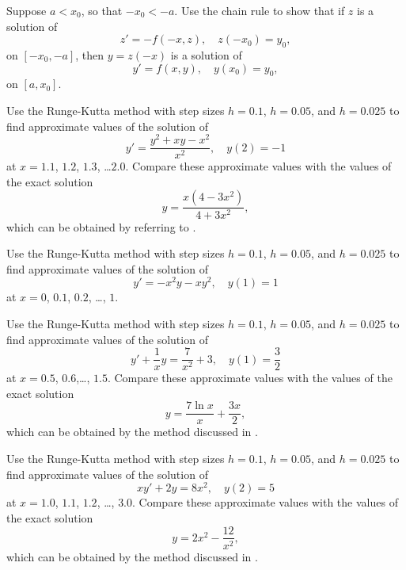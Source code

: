 \begin{exerciselist}
\item\label{exer:3.3.23}\Cex
Suppose $a<x_0$, so that $-x_0<-a$.
Use the chain rule to show that if  $z$ is a solution of
\[
z'=-f(-x,z),\quad z(-x_0)=y_0,
\]
on $[-x_0,-a]$, then $y=z(-x)$ is a solution of
\[
y'=f(x,y),\quad y(x_0)=y_0,
\]
on $[a,x_0]$.

\item\label{exer:3.3.24}\Cex
Use the Runge-Kutta  method with step sizes $h=0.1$, $h=0.05$,
and $h=0.025$ to find approximate values of the solution of
\[
y'=\frac{y^2+xy-x^2}{x^2},\quad y(2)=-1
\]
at $x=1.1$, $1.2$, $1.3$, \dots $2.0$.
 Compare these approximate values
with the values of the exact solution
\[
y=\frac{x(4-3x^2)}{4+3x^2},
\]
which can be obtained by referring to .

\item\label{exer:3.3.25}\Cex
Use the Runge-Kutta  method with step sizes $h=0.1$,  $h=0.05$,
and $h=0.025$
 to find approximate values of the solution of
\[
y'=-x^2y-xy^2,\quad y(1)=1
\]
at $x=0$, $0.1$, $0.2$, \dots, $1$.

\item\label{exer:3.3.26}\Cex
Use the Runge-Kutta  method with step sizes $h=0.1$,  $h=0.05$,
and $h=0.025$
 to find approximate values of the solution of
\[
y'+\frac{1}{x}y=\frac{7}{x^2}+3,\quad y(1)=\frac{3}{2}
\]
at $x=0.5$, $0.6$,\dots, $1.5$.
 Compare these approximate values
with the values of the exact solution
\[
y=\frac{7\ln x}{x}+\frac{3x}{2},
\]
which can be obtained by the method discussed in
.

\item\label{exer:3.3.27}\Cex
Use the Runge-Kutta  method with step sizes $h=0.1$,  $h=0.05$,
and $h=0.025$
 to find approximate values of the solution of
\[
xy'+2y=8x^2,\quad y(2)=5
\]
at $x=1.0$, $1.1$, $1.2$, \dots, $3.0$.
 Compare these approximate values
with the values of the exact solution
\[
y=2x^2-\frac{12}{x^2},
\]
which can be obtained by the method discussed in
.



\end{exerciselist}
